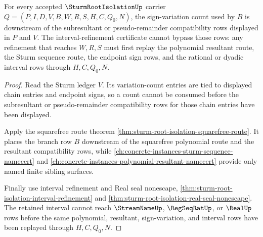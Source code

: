 \begin{theorem}
\label{thm:sturm-root-isolation-subresultant-sign-variation}
For every accepted $\SturmRootIsolationUp$ carrier $Q=(P,I,D,V,B,W,R,S,H,C,Q_0,N)$, the sign-variation count used by $B$ is downstream of the subresultant or pseudo-remainder compatibility rows displayed in $P$ and $V$. The interval-refinement certificate cannot bypass those rows: any refinement that reaches $W,R,S$ must first replay the polynomial resultant route, the Sturm sequence route, the endpoint sign rows, and the rational or dyadic interval rows through $H,C,Q_0,N$.
\end{theorem}
\begin{proof}
Read the Sturm ledger $V$. Its variation-count entries are tied to displayed chain entries and endpoint signs, so a count cannot be consumed before the subresultant or pseudo-remainder compatibility rows for those chain entries have been displayed.

Apply the squarefree route theorem \autoref{thm:sturm-root-isolation-squarefree-route}. It places the branch row $B$ downstream of the squarefree polynomial route and the resultant compatibility rows, while \autoref{ch:concrete-instances-sturm-sequence-namecert} and \autoref{ch:concrete-instances-polynomial-resultant-namecert} provide only named finite sibling surfaces.

Finally use interval refinement and Real seal nonescape, \autoref{thm:sturm-root-isolation-interval-refinement} and \autoref{thm:sturm-root-isolation-real-seal-nonescape}. The retained interval cannot reach $\StreamNameUp$, $\RegSeqRatUp$, or $\RealUp$ rows before the same polynomial, resultant, sign-variation, and interval rows have been replayed through $H,C,Q_0,N$.
\end{proof}

